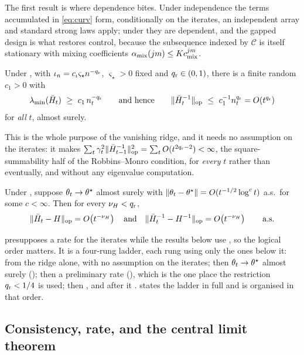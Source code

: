 The first result is where dependence bites. Under independence the terms accumulated in
\eqref{eq:curv} form, conditionally on the iterates, an independent array and standard strong laws
apply; under  they are dependent, and the gapped design is what restores control,
because the subsequence indexed by $\mathcal{C}$ is itself stationary with mixing coefficients
$\alpha_{\mathrm{mix}}(jm)\le Kc_{\mathrm{mix}}^{jm}$.

\begin{lemma}
\label{lem:ridge}
Under , with $\iota_n=c_\iota\varsigma_\star n^{-q_{\mathrm r}}$, $\varsigma_\star>0$
fixed and $q_{\mathrm r}\in(0,1)$, there is
a finite random $c_1>0$ with
\[
\lambda_{\min}(\Hb_t)\ \ge\ c_1\,n_t^{-\qr}
\qquad\text{and hence}\qquad
\opnorm{\Hb_t^{-1}}\ \le\ c_1^{-1}n_t^{\qr}=O(t^{\qr})
\]
for \emph{all} $t$, almost surely.
\end{lemma}

This is the whole purpose of the vanishing ridge, and it needs no assumption on the iterates: it
makes $\sum_t \gamma_t^2\lVert \bar{H}_{t-1}^{-1} \rVert_{\mathrm{op}}^2=\sum_tO(t^{2q_{\mathrm r}-2})<\infty$, the square-summability
half of the Robbins--Monro condition, for \emph{every} $t$ rather than eventually, and without any
eigenvalue computation.

\begin{theorem}
\label{thm:curv}
Under , suppose $\theta_t\to\theta^\star$ almost surely with
$\lVert \theta_t-\theta^\star \rVert=O(t^{-1/2}\log^{c}t)$ a.s.\ for some $c<\infty$. Then for every
$\nu_H<q_{\mathrm r}$,
\[
\lVert \bar{H}_t-H \rVert_{\mathrm{op}}=O\!\left(t^{-\nu_H}\right)
\quad\text{and}\quad
\lVert \bar{H}_t^{-1}-H^{-1} \rVert_{\mathrm{op}}=O\!\left(t^{-\nu_H}\right)
\qquad\text{a.s.}
\]
\end{theorem}

 presupposes a rate for the iterates while the results below use
, so the logical order matters. It is a four-rung ladder, each rung using only the
ones below it:  from the ridge alone, with no assumption on the iterates; then
$\theta_t\to\theta^\star$ almost surely (); then a preliminary rate (), which
is the one place the restriction $q_{\mathrm r}<1/4$ is used; then , and after it
.  states the ladder in full and
 is organised in that order.

\subsection{Consistency, rate, and the central limit theorem}

